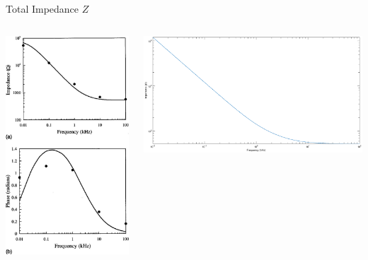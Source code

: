 \documentclass[11pt]{beamer}
\begin{document}
\begin{frame}{Total Impedance $Z$}
    \begin{columns}[onlytextwidth]
        \begin{column}{0.35\textwidth}
            \includegraphics[width=\columnwidth]{5.jpg}
        \end{column}
        \begin{column}{0.6\textwidth}
            \includegraphics[width=\columnwidth]{3.eps}

\end{column}
\end{columns}
\end{frame}
\end{document}
